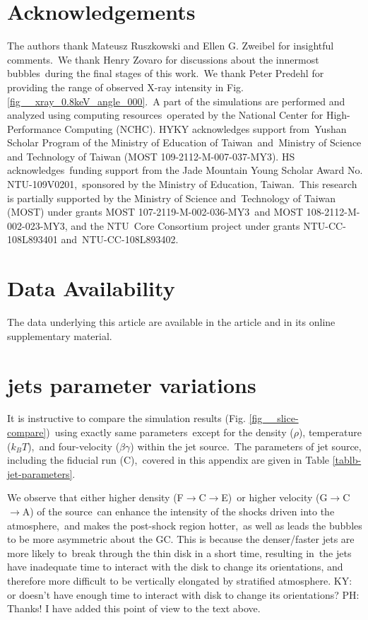 \documentclass[fleqn,usenatbib,useAMS]{mnras}
\begin{document}
\section{Acknowledgements}
The authors thank Mateusz Ruszkowski and Ellen G. Zweibel for insightful comments.\
We thank Henry Zovaro for discussions about the innermost bubbles\
during the final stages of this work.\
We thank Peter Predehl for providing the range of observed X-ray intensity in Fig. \ref{fig__xray_0.8keV_angle_000}.\
A part of the simulations are performed and analyzed using computing resources\
operated by the National Center for High-Performance Computing (NCHC).
HYKY acknowledges support from\
Yushan Scholar Program of the Ministry of Education of Taiwan\
and\
Ministry of Science and Technology of Taiwan (MOST 109-2112-M-007-037-MY3).
HS acknowledges\
funding support from the Jade Mountain Young Scholar Award No. NTU-109V0201,\
sponsored by the Ministry of Education, Taiwan.\
This research is partially supported by the Ministry of Science and\
Technology of Taiwan (MOST) under grants MOST 107-2119-M-002-036-MY3\
and MOST 108-2112-M-002-023-MY3, and the NTU\
Core Consortium project under grants NTU-CC-108L893401 and\
NTU-CC-108L893402.

\section*{Data Availability}
The data underlying this article are available in the article and in its online supplementary material.






\appendix
\section{jets parameter variations}

It is instructive to compare the simulation results (Fig. \ref{fig__slice-compare})\
using exactly same parameters\
except for the density ($\rho$), temperature ($k_{B}T$),\
and four-velocity ($\beta\gamma$) within the jet source.\
The parameters of jet source, including the fiducial run (C),\
covered in this appendix are given in Table \ref{tablb-jet-parameters}.

We observe that either higher density (F$\rightarrow$C$\rightarrow$E)\
or higher velocity (G$\rightarrow$C$\rightarrow$A) of the source\
can enhance the intensity of the shocks driven into the atmosphere,\
and makes the post-shock region hotter,\
as well as leads the bubbles to be more asymmetric about the GC.
This is because the denser/faster jets are more likely to\
break through the thin disk in a short time, resulting in\
the jets have inadequate time to interact with the disk to change its orientations,
and therefore more difficult to be vertically elongated by stratified atmosphere.
{\color{red} KY: or doesn't have enough time to interact with disk to change its orientations?
PH: Thanks! I have added this point of view to the text above.}
\end{document}
